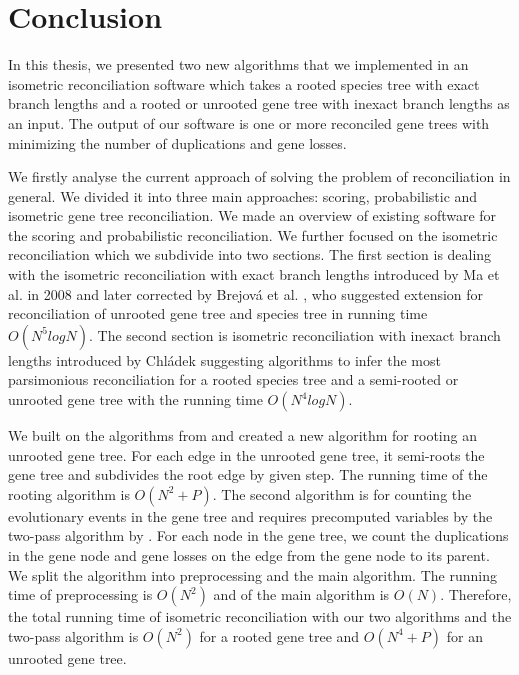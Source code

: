 \chapter*{Conclusion}

In this thesis, we presented two new algorithms that we implemented in an isometric reconciliation software which takes a rooted species tree with exact branch lengths and a rooted or unrooted gene tree with inexact branch lengths as an input. The output of our software is one or more reconciled gene trees with minimizing the number of duplications and gene losses.

We firstly analyse the current approach of solving the problem of reconciliation in general. We divided it into three main approaches: scoring, probabilistic and isometric gene tree reconciliation. We made an overview of existing software for the scoring and probabilistic reconciliation. We further focused on the isometric reconciliation which we subdivide into two sections. The first section is dealing with the isometric reconciliation with exact branch lengths introduced by Ma et al. \cite{ma} in 2008 and later corrected by Brejová et al. \cite{brejova}, who suggested extension for reconciliation of unrooted gene tree and species tree in running time $O(N^5 log N)$. The second section is isometric reconciliation with inexact branch lengths introduced by Chládek \cite{chladek_thesis} suggesting algorithms to infer the most parsimonious reconciliation for a rooted species tree and a semi-rooted or unrooted gene tree with the running time $O(N^4 log N)$.

We built on the algorithms from \cite{chladek_thesis} and created a new algorithm for rooting an unrooted gene tree. For each edge in the unrooted gene tree, it semi-roots the gene tree and subdivides the root edge by given step. The running time of the rooting algorithm is $O(N^2 + P)$. The second algorithm is for counting the evolutionary events in the gene tree and requires precomputed variables by the two-pass algorithm by \cite{chladek_thesis}. For each node in the gene tree, we count the duplications in the gene node and gene losses on the edge from the gene node to its parent. We split the algorithm into preprocessing and the main algorithm. The running time of preprocessing is $O(N^2)$ and of the main algorithm is $O(N)$. Therefore, the total running time of isometric reconciliation with our two algorithms and the two-pass algorithm \cite{chladek_thesis} is $O(N^2)$ for a rooted gene tree and $O(N^4 + P)$ for an unrooted gene tree.

